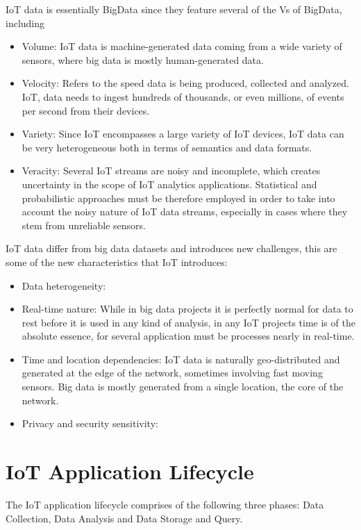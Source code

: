 IoT data is essentially BigData since they feature several of the Vs of BigData, including
\begin{itemize}
    \item Volume: IoT data is machine-generated data coming from a wide variety of sensors, where big data is mostly human-generated data.
    \item Velocity: Refers to the speed data is being produced, collected and analyzed. IoT, data needs to ingest hundreds of thousands, or even millions, of events per second from their devices.
    \item Variety: Since IoT encompasses a large variety of IoT devices, IoT data can be very heterogeneous both in terms of semantics and data formats.
    \item Veracity: Several IoT streams are noisy and incomplete, which creates
uncertainty in the scope of IoT analytics applications. Statistical and probabilistic approaches must be
therefore employed in order to take into account the noisy nature of IoT data streams, especially in
cases where they stem from unreliable sensors.
\end{itemize}

IoT data differ from big data datasets and introduces new challenges, this are some of the new characteristics that IoT introduces:

\begin{itemize}
    \item Data heterogeneity:
    \item Real-time nature: While in big data projects it is perfectly normal for data to rest before it is used in any kind of analysis, in any IoT projects time is of the absolute essence, for several application must be processes nearly in real-time.
    \item Time and location dependencies: IoT data is naturally geo-distributed and generated at the edge of the network, sometimes involving fast moving sensors. Big data is mostly generated from a single location, the core of the network.
    \item Privacy and security sensitivity:
\end{itemize}

\section{IoT Application Lifecycle}
The IoT application lifecycle comprises of the following three phases: Data Collection, Data Analysis and Data Storage and Query.

